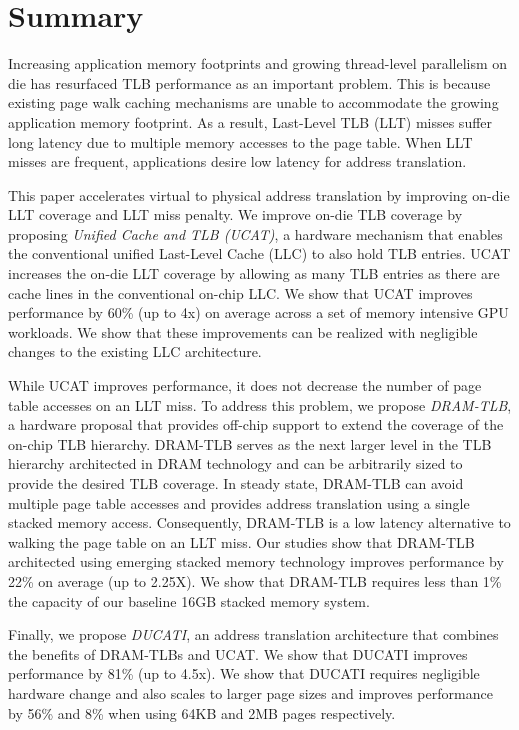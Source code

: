 \section{Summary}

\noindent Increasing application memory footprints and growing
thread-level parallelism on die has resurfaced TLB performance as an
important problem. This is because existing page walk caching
mechanisms are unable to accommodate the growing application memory
footprint. As a result, Last-Level TLB (LLT) misses suffer long
latency due to multiple memory accesses to the page table. When LLT
misses are frequent, applications desire low latency for address
translation.

This paper accelerates virtual to physical address translation by
improving on-die LLT coverage and LLT miss penalty. We improve on-die
TLB coverage by proposing {\em Unified Cache and TLB (UCAT)}, a
hardware mechanism that enables the conventional unified Last-Level
Cache (LLC) to also hold TLB entries. UCAT increases the on-die LLT
coverage by allowing as many TLB entries as there are cache lines in
the conventional on-chip LLC. We show that UCAT improves performance
by 60\% (up to 4x) on average across a set of memory intensive GPU
workloads. We show that these improvements can be realized with
negligible changes to the existing LLC architecture.


While UCAT improves performance, it does not decrease the number of
page table accesses on an LLT miss. To address this problem, we
propose {\em DRAM-TLB}, a hardware proposal that provides off-chip
support to extend the coverage of the on-chip TLB hierarchy. DRAM-TLB
serves as the next larger level in the TLB hierarchy architected in
DRAM technology and can be arbitrarily sized to provide the desired
TLB coverage. In steady state, DRAM-TLB can avoid multiple page table
accesses and provides address translation using a single stacked
memory access. Consequently, DRAM-TLB is a low latency alternative to
walking the page table on an LLT miss. Our studies show that DRAM-TLB
architected using emerging stacked memory technology improves
performance by 22\% on average (up to 2.25X). We show that DRAM-TLB
requires less than 1\% the capacity of our baseline 16GB stacked
memory system.

Finally, we propose {\em DUCATI}, an address translation architecture
that combines the benefits of DRAM-TLBs and UCAT. We show that DUCATI
improves performance by 81\% (up to 4.5x). We show that DUCATI
requires negligible hardware change and also scales to larger page
sizes and improves performance by 56\% and 8\% when using 64KB and 2MB
pages respectively.

% 
